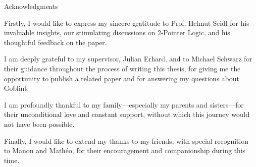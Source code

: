 \thispagestyle{empty}

\vspace*{20mm}

\begin{center}
    { Acknowledgments}
\end{center}

\vspace{10mm}

Firstly, I would like to express my sincere gratitude to Prof. Helmut Seidl for his invaluable insights, our stimulating discussions on 2-Pointer Logic, and his thoughtful feedback on the paper.

I am deeply grateful to my supervisor, Julian Erhard, and to Michael Schwarz for their guidance throughout the process of writing this thesis, for giving me the opportunity to publish a related paper and for answering my questions about Goblint.

I am profoundly thankful to my family---especially my parents and sisters---for their unconditional love and constant support, without which this journey would not have been possible.

Finally, I would like to extend my thanks to my friends, with special recognition to Manon and Mathéo, for their encouragement and companionship during this time.



\cleardoublepage{}
